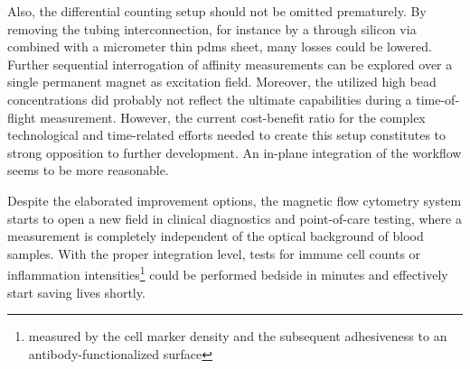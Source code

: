 Also, the differential counting setup should not be omitted prematurely. By removing the tubing interconnection, for instance by a through silicon via combined with a micrometer thin \gls{pdms} sheet, many losses could be lowered. Further sequential interrogation of affinity measurements can be explored over a single permanent magnet as excitation field. Moreover, the utilized high bead concentrations did probably not reflect the ultimate capabilities during a time-of-flight measurement. However, the current cost-benefit ratio for the complex technological and time-related efforts needed to create this setup constitutes to strong opposition to further development. An in-plane integration of the workflow seems to be more reasonable.

Despite the elaborated improvement options, the magnetic flow cytometry system starts to open a new field in clinical diagnostics and point-of-care testing, where a measurement is completely independent of the optical background of blood samples. With the proper integration level, tests for immune cell counts or inflammation intensities\footnote{measured by the cell marker density and the subsequent adhesiveness to an antibody-functionalized surface} could be performed bedside in minutes and effectively start saving lives shortly. 


